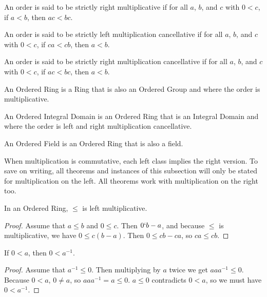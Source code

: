 \documentclass[../../math.tex]{subfiles}
\begin{document}
\begin{class}
    An order is said to be strictly right multiplicative if for all $a$, $b$,
    and $c$ with $0 < c$, if $a < b$, then $ac < bc$.
\end{class}

\begin{class}
    An order is said to be strictly left multiplication cancellative if for all
    $a$, $b$, and $c$ with $0 < c$, if $ca < cb$, then $a < b$.
\end{class}

\begin{class}
    An order is said to be strictly right multiplication cancellative if for all
    $a$, $b$, and $c$ with $0 < c$, if $ac < bc$, then $a < b$.
\end{class}

\begin{class}
    An Ordered Ring is a Ring that is also an Ordered Group and where the order
    is multiplicative.
\end{class}

\begin{class}
    An Ordered Integral Domain is an Ordered Ring that is an Integral Domain and
    where the order is left and right multiplication cancellative.
\end{class}

\begin{class}
    An Ordered Field is an Ordered Ring that is also a field.
\end{class}

When multiplication is commutative, each left class implies the right version.
To save on writing, all theorems and instances of this subsection will only be
stated for multiplication on the left.  All theorems work with multiplication on
the right too.

\begin{instance}
    In an Ordered Ring, $\leq$ is left multiplicative.
\end{instance}
\begin{proof}
    Assume that $a \leq b$ and $0 \leq c$.  Then $0 \lq b - a$, and because
    $\leq$ is multiplicative, we have $0 \leq c(b - a)$.  Then $0 \leq cb - ca$,
    so $ca \leq cb$.
\end{proof}

\begin{theorem}
    If $0 < a$, then $0 < a^{-1}$.
\end{theorem}
\begin{proof}
    Assume that $a^{-1} \leq 0$. Then multiplying by $a$ twice we get $aaa^{-1}
    \leq 0$.  Because $0 < a$, $0 \neq a$, so $aaa^{-1} = a \leq 0$.  $a \leq 0$
    contradicts $0 < a$, so we must have $0 < a^{-1}$.
\end{proof}
\end{document}
